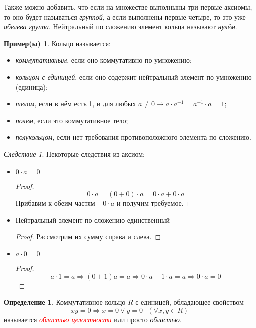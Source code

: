 \documentclass[a4paper,100pt]{article}
\theoremstyle{indented}
\theoremstyle{definition}
\newtheorem{defn}{Определение}
\newtheorem{exl}{Пример(ы)}
\theoremstyle{remark}
\newtheorem{cons}{Следствие}
\begin{document}
Также можно добавить, что если на множестве выполныны три первые аксиомы, то оно будет называться \textit{группой}, а если выполнены первые четыре, то это уже \textit{абелева группа}. Нейтральный по сложению элемент кольца называют \textit{нулём}.

\begin{exl}
    Кольцо называется:\

    \begin{itemize}
        \item \textit{коммутативным}, если оно коммутативно по умножению;
        \item \textit{кольцом с единицей}, если оно содержит нейтральный элемент по умножению (единица);
        \item \textit{телом}, если в нём есть 1, и для любых $a\neq 0 \rightarrow a \cdot a^{-1}=a^{-1}\cdot a=1$;
        \item \textit{полем}, если это коммутативное тело;
        \item \textit{полукольцом}, если нет требования противоположного элемента по сложению.
    \end{itemize}
\end{exl}

\begin{cons}
    Некоторые следствия из аксиом:\

    \begin{itemize}
        \item $0\cdot a = 0$
        \begin{proof}
            \[
               0\cdot a = (0+0)\cdot a = 0\cdot a + 0\cdot a
            \]
            Прибавим к обеим частям $-0\cdot a$ и получим требуемое.
        \end{proof}
        \item Нейтральный элемент по сложению единственный
        \begin{proof}
            Рассмотрим их сумму справа и слева.
        \end{proof}
        \item $a\cdot 0 = 0$
        \begin{proof}
            \[
                a\cdot 1 = a \Longrightarrow (0+1)a = a \Longrightarrow 0\cdot a+1\cdot a = a \Longrightarrow 0\cdot a = 0
            \]
        \end{proof}
    \end{itemize}
\end{cons}

\begin{defn}
    Коммутативное кольцо $R$ с единицей, обладающее свойством
    \[
        xy=0 \Longrightarrow x=0 \vee y=0 \text{ }(\forall x, y\in R)
    \]
    называется \hypertarget{n2}{\textcolor{red}{\textit{областью целостности}}} или просто \textit{областью}.
\end{defn}
\end{document}
